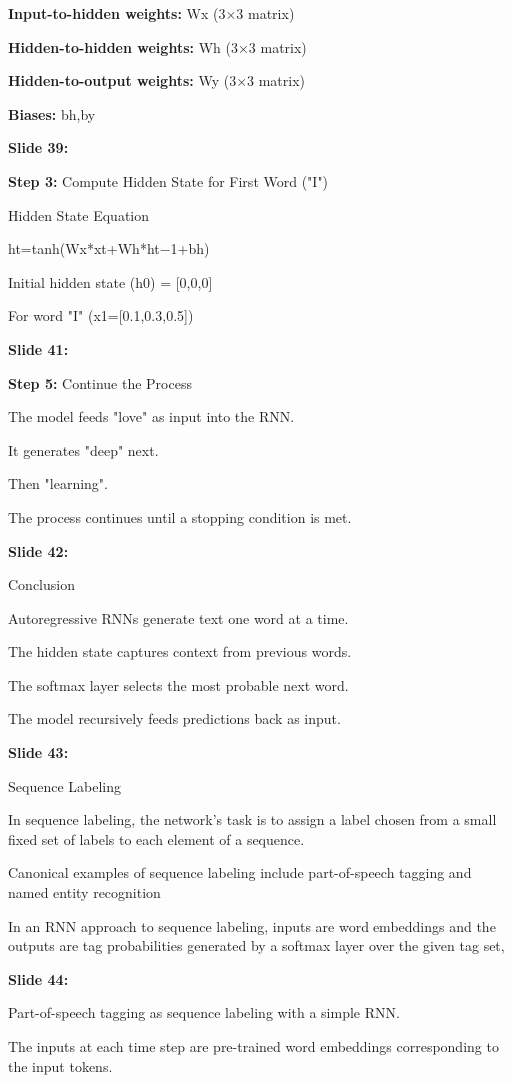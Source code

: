 \documentclass[11pt,a4paper]{article}
\begin{document}
\textbf{Input-to-hidden weights:}  Wx​ (3×3 matrix)

\textbf{Hidden-to-hidden weights:}  Wh​ (3×3 matrix)

\textbf{Hidden-to-output weights:}  Wy​ (3×3 matrix)

\textbf{Biases:}  bh,by​

\textbf{Slide 39:}

\textbf{Step 3:}  Compute Hidden State for First Word ("I")

Hidden State Equation

ht=tanh⁡(Wx*xt+Wh*ht−1+bh)

Initial hidden state (h0​) = [0,0,0]

For word "I" (x1=[0.1,0.3,0.5])

\textbf{Slide 41:}

\textbf{Step 5:}  Continue the Process

The model feeds "love" as input into the RNN.

It generates "deep" next.

Then "learning".

The process continues until a stopping condition is met.

\textbf{Slide 42:}

Conclusion

Autoregressive RNNs generate text one word at a time.

The hidden state captures context from previous words.

The softmax layer selects the most probable next word.

The model recursively feeds predictions back as input.

\textbf{Slide 43:}

Sequence Labeling

In sequence labeling, the network’s task is to assign a label chosen from a small fixed set of labels to each element of a sequence.

Canonical examples of sequence labeling include part-of-speech tagging and named entity recognition

In an RNN approach to sequence labeling, inputs are wordembeddings and the outputs are tag probabilities generated by a softmax layer over the given tag set,

\textbf{Slide 44:}

Part-of-speech tagging as sequence labeling with a simple RNN.

The inputs at each time step are pre-trained word embeddings corresponding to the input tokens.
\end{document}

